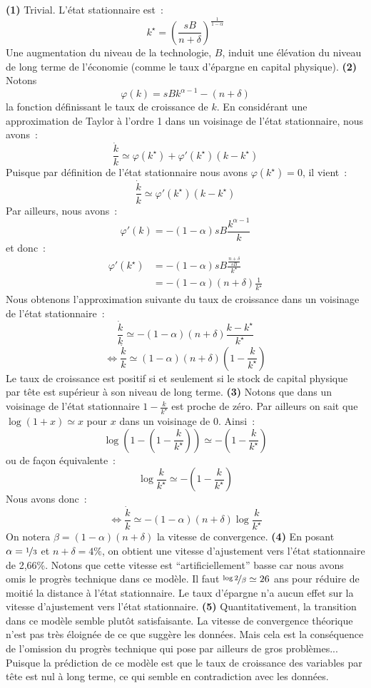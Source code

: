 \documentclass[10pt,a4paper,notitlepage,onecolumn]{article}
\newcommand{\question}[1]{\textbf{(#1)}}
\newcommand{\growth}[1]{\frac{\dot{#1}}{#1}}
\begin{document}
\question{1} Trivial. L'état stationnaire est :
\[
k^{\star} = \left(\frac{sB}{n+\delta}\right)^{\frac{1}{1-\alpha}}
\]
Une  augmentation  du  niveau  de  la  technologie,  $B$,  induit  une
élévation  du  niveau de  long  terme  de  l'économie (comme  le  taux
d'épargne en capital physique). \question{2} Notons
\[
\varphi(k) = sBk^{\alpha-1} - (n+\delta) 
\]
la fonction définissant  le taux de croissance de  $k$. En considérant
une approximation  de Taylor à l'ordre  1 dans un voisinage  de l'état
stationnaire, nous avons :
\[
\growth{k} \simeq \varphi (k^\star) + \varphi '(k^{\star}) \left(k-k^{\star}\right)
\]
Puisque par définition de l'état stationnaire nous avons $\varphi (k^\star)=0$, il vient :
\[
\growth{k} \simeq \varphi '(k^{\star}) \left(k-k^{\star}\right)
\]
Par ailleurs, nous avons :
\[
\varphi '(k) = -(1-\alpha)sB\frac{k^{\alpha-1}}{k}
\]
et donc :
\[
\begin{split}
  \varphi '(k^{\star}) &= -(1-\alpha)sB\frac{\frac{n+\delta}{sB}}{k^{\star}}\\
  &= -(1-\alpha)(n+\delta)\frac{1}{k^{\star}}
\end{split}
\]
Nous obtenons l'approximation  suivante du taux de  croissance dans un
voisinage de l'état stationnaire :
\[
\growth{k} \simeq -(1-\alpha)(n+\delta)\frac{k-k^{\star}}{k^{\star}}
\] 
\[
\Leftrightarrow \growth{k} \simeq (1-\alpha)(n+\delta)\left(1-\frac{k}{k^{\star}}\right)
\]
Le  taux de  croissance est  positif si  et seulement  si le  stock de
capital physique  par tête est supérieur  à son niveau de  long terme.
\question{3}  Notons  que dans  un  voisinage  de l'état  stationnaire
$1-\frac{k}{k^{\star}}$ est proche  de zéro. Par ailleurs  on sait que
$\log (1+x)\simeq x$ pour $x$ dans un voisinage de 0. Ainsi :
\[
\log \left(1-\left(1-\frac{k}{k^{\star}}\right)\right) \simeq -\left(1-\frac{k}{k^{\star}}\right) 
\]
ou de façon équivalente :
\[
\log \frac{k}{k^{\star}} \simeq -\left(1-\frac{k}{k^{\star}}\right) 
\]
Nous avons donc :
\[
\Leftrightarrow \growth{k} \simeq -(1-\alpha)(n+\delta)\log \frac{k}{k^{\star}}
\]
On notera  $\beta =  (1-\alpha)(n+\delta)$ la vitesse  de convergence.
\question{4} En posant  $\alpha=\nicefrac{1}{3}$ et $n+\delta=4\%$, on
obtient une  vitesse d'ajustement vers l'état  stationnaire de 2,66\%.
Notons que cette vitesse est ``artificiellement'' basse car nous avons
omis le  progrès technique  dans ce  modèle.  Il  faut $\nicefrac{\log
  2}{\beta}\simeq 26$ ans pour réduire  de moitié la distance à l'état
stationnaire.   Le  taux d'épargne  n'a  aucun  effet sur  la  vitesse
d'ajustement vers l'état  stationnaire. \question{5} Quantitativement,
la transition dans  ce modèle semble plutôt  satisfaisante. La vitesse
de convergence théorique n'est pas très éloignée de ce que suggère les
données.   Mais  cela est  la  conséquence  de l'omission  du  progrès
technique  qui pose  par  ailleurs de  gros  problèmes...  Puisque  la
prédiction de  ce modèle est que  le taux de croissance  des variables
par tête est nul à long terme, ce qui semble en contradiction avec les
données.
\end{document}
